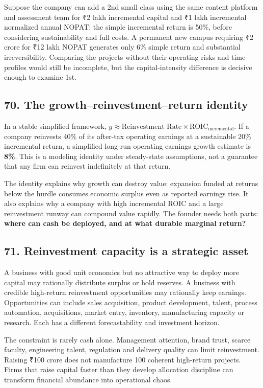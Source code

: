 Suppose the company can add a 2nd small class using the same content platform and assessment team for ₹2 lakh incremental capital and ₹1 lakh incremental normalized annual NOPAT: the simple incremental return is 50\%, before considering sustainability and full costs. A permanent new campus requiring ₹2 crore for ₹12 lakh NOPAT generates only 6\% simple return and substantial irreversibility. Comparing the projects without their operating risks and time profiles would still be incomplete, but the capital-intensity difference is decisive enough to examine 1st.

\subsection{70. The growth–reinvestment–return identity}


In a stable simplified framework, $g \approx \text{Reinvestment Rate} \times \mathrm{ROIC}_{\text{incremental}}$. If a company reinvests 40\% of its after-tax operating earnings at a sustainable 20\% incremental return, a simplified long-run operating earnings growth estimate is \textbf{8\%}. This is a modeling identity under steady-state assumptions, not a guarantee that any firm can reinvest indefinitely at that return.

The identity explains why growth can destroy value: expansion funded at returns below the hurdle consumes economic surplus even as reported earnings rise. It also explains why a company with high incremental ROIC and a large reinvestment runway can compound value rapidly. The founder needs both parts: \textbf{where can cash be deployed, and at what durable marginal return?}

\subsection{71. Reinvestment capacity is a strategic asset}


A business with good unit economics but no attractive way to deploy more capital may rationally distribute surplus or hold reserves. A business with credible high-return reinvestment opportunities may rationally keep earnings. Opportunities can include sales acquisition, product development, talent, process automation, acquisitions, market entry, inventory, manufacturing capacity or research. Each has a different forecastability and investment horizon.

The constraint is rarely cash alone. Management attention, brand trust, scarce faculty, engineering talent, regulation and delivery quality can limit reinvestment. Raising ₹100 crore does not manufacture 100 coherent high-return projects. Firms that raise capital faster than they develop allocation discipline can transform financial abundance into operational chaos.

